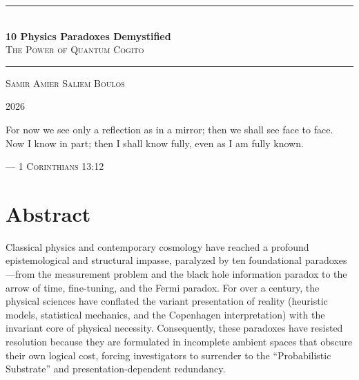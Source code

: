 \documentclass[12pt,twoside]{extbook}
\theoremstyle{definition}
\theoremstyle{remark}
\begin{document}
\frontmatter

\begin{titlepage}
    \centering
    \vspace*{2cm}
    
    {\color{brandSecondary}\rule{\linewidth}{1.5pt}}\\[0.4cm]
    {\Huge\bfseries\color{brandPrimary} 10 Physics Paradoxes Demystified}\\[0.3cm]
    {\Large\scshape\color{brandSecondary} The Power of Quantum Cogito}
    {\color{brandSecondary}\rule{\linewidth}{1.5pt}}
    
    \vfill
    
    {\Large\scshape Samir Amier Saliem Boulos}
    
    \vspace{0.8cm}
    
    \vfill
    {\large 2026}
\end{titlepage}

\thispagestyle{empty}
\vspace*{\fill}
\begin{center}
\epigraph{For now we see only a reflection as in a mirror; then we shall see face to face. Now I know in part; then I shall know fully, even as I am fully known.}{--- \textsc{1 Corinthians 13:12}}
\end{center}
\vspace*{\fill}
\newpage

\chapter*{Abstract}

\setlength{\parindent}{0pt}
\setlength{\parskip}{1em}

Classical physics and contemporary cosmology have reached a profound epistemological and structural impasse, paralyzed by ten foundational paradoxes---from the measurement problem and the black hole information paradox to the arrow of time, fine-tuning, and the Fermi paradox. For over a century, the physical sciences have conflated the variant presentation of reality (heuristic models, statistical mechanics, and the Copenhagen interpretation) with the invariant core of physical necessity. Consequently, these paradoxes have resisted resolution because they are formulated in incomplete ambient spaces that obscure their own logical cost, forcing investigators to surrender to the ``Probabilistic Substrate'' and presentation-dependent redundancy.
\end{document}
